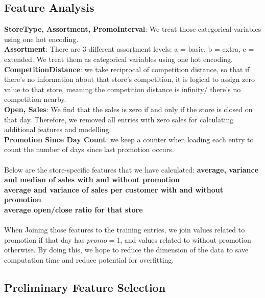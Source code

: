 \documentclass{article}
\begin{document}
\subsection{Feature Analysis}
\textbf{StoreType, Assortment, PromoInterval}: We treat those categorical variables using one hot encoding.
\\
\textbf{Assortment}: There are 3 different assortment levels: a = basic, b = extra, c = extended. We treat them as categorical variables using one hot encoding.\\
\textbf{CompetitionDistance}: we take reciprocal of competition distance, so that if there’s no information about that store’s competition, it is logical to assign zero value to that store, meaning the competition distance is infinity/ there’s no competition nearby.\\
\textbf{Open, Sales}: We find that the sales is zero if and only if the store is closed on that day. Therefore, we removed all entries with zero sales for calculating additional features and modelling. \\
\textbf{Promotion Since Day Count}: we keep a counter when loading each entry to count the number of days since last promotion occurs.\\\\
Below are the store-specific features that we have calculated:
\textbf{average, variance and median of sales with and without promotion}\\
\textbf{average and variance of sales per customer with and without promotion}\\
\textbf{average open/close ratio for that store}\\\\
When Joining those features to the training entries, we join values related to promotion if that day has $promo = 1$, and values related to without promotion otherwise. By doing this, we hope to reduce the dimension of the data to save computation time and reduce potential for overfitting.

\subsection{Preliminary Feature Selection}
\end{document}
